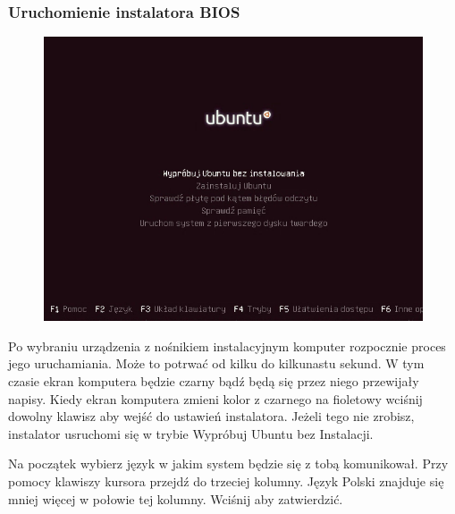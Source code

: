 \subsubsection{Uruchomienie instalatora BIOS}
\label{instalacja_uruchomienie}
\begin{figure}
                \includegraphics[width=\linewidth]{images/instalacja_BIOS_boot.png}
\end{figure}

Po wybraniu urządzenia z nośnikiem instalacyjnym komputer rozpocznie proces jego uruchamiania. Może to potrwać od kilku do kilkunastu sekund. W tym czasie ekran komputera będzie czarny bądź będą się przez niego przewijały napisy. Kiedy ekran komputera zmieni kolor z czarnego na fioletowy wciśnij dowolny klawisz aby wejść do ustawień instalatora. Jeżeli tego nie zrobisz, instalator usruchomi się w trybie \textcolor{ubuntu_orange}{Wypróbuj Ubuntu bez Instalacji}.

Na początek wybierz język w jakim system będzie się z tobą komunikował. Przy pomocy klawiszy kursora przejdź do trzeciej kolumny. Język Polski znajduje się mniej więcej w połowie tej kolumny. Wciśnij  aby zatwierdzić.

